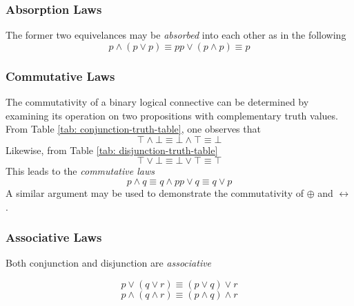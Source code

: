 \documentclass[twocolumn]{report}
\begin{document}
\subsubsection{Absorption Laws}
The former two equivelances may be \textit{absorbed} into each other as in the following 
\begin{subequations}
	\begin{equation}
		p \wedge (p \lor p) \equiv p
		\label{eqn: absorption-1}
	\end{equation}
	\begin{equation}
		p \lor (p \wedge p) \equiv p
		\label{eqn: absorption-2}
	\end{equation}
\end{subequations}
\subsubsection{Commutative Laws}
The commutativity of a binary logical connective can be determined by examining its operation on two propositions with complementary truth values. 
From Table \ref{tab: conjunction-truth-table}, one observes that
\[
	\top \wedge \bot \equiv \bot \wedge \top \equiv \bot
\]
Likewise, from Table \ref{tab: disjunction-truth-table}
\[
	\top \lor \bot \equiv \bot \lor \top \equiv \top
\]
This leads to the \textit{commutative laws}
\begin{subequations}
	\begin{equation}
		p \wedge q \equiv q \wedge p
		\label{eqn: conjunction-commutative-law}
	\end{equation}
	\begin{equation}
		p \lor q \equiv q \lor p
		\label{eqn: disjunction-commutative-law}
	\end{equation}
\end{subequations}
A similar argument may be used to demonstrate the commutativity of $\oplus$ and $\leftrightarrow$.
\subsubsection{Associative Laws}
Both conjunction and disjunction are \textit{associative}
\begin{subequation}
	\begin{equation}
		p \lor (q \lor r) \equiv (p \lor q) \lor r
		\label{eqn: disjunction-associative-law}
	\end{equation}
	\begin{equation}
		p \wedge (q \wedge r) \equiv (p\wedge q) \wedge r
		\label{eqn: conjunction-associative-law}
	\end{equation}
\end{subequation}
\end{document}
